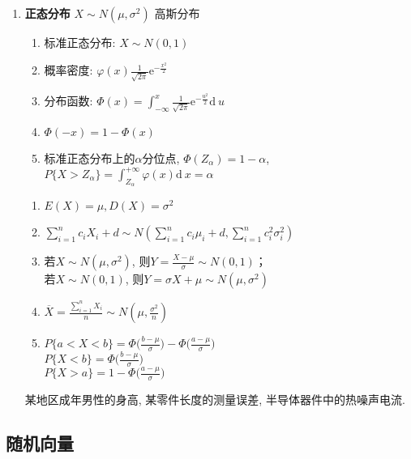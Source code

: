 \documentclass[10pt,a4paper,nofonts]{ctexart}
\newcommand{\D}{\displaystyle}
\renewcommand{\d}{{\mathrm{d}\:\!}}
\newcommand{\e}{{\mathrm{e}}}
\begin{document}
\begin{multicols}{2}
\begin{enumerate}
\item {\bf 正态分布} $X\sim N(\mu,\sigma^2)$ 高斯分布\\
\fbox{$f(x)=\D\frac{1}{\sqrt{2\pi}\sigma}\e^{-\frac{(x-u)^2}{2\sigma^2}}$\\}
\begin{enumerate}
\item 标准正态分布: $X\sim N(0,1)$
\item 概率密度: $\D\varphi(x)\frac{1}{\sqrt{2\pi}}\e^{-\frac{x^2}{2}}$
\item 分布函数: $\D\varPhi(x)=\int_{-\infty}^{x}\frac{1}{\sqrt{2\pi}}\e^{-\frac{u^2}{2}}\d u$
\item $\varPhi(-x)=1-\varPhi(x)$
\item 标准正态分布上的$\alpha$分位点, $\varPhi(Z_\alpha)=1-\alpha$, \\$\D P\{X>Z_\alpha\}=\int_{Z_\alpha}^{+\infty}\varphi(x)\d x=\alpha$
\end{enumerate}
\begin{enumerate}[label={\sf 性质\arabic*}]
\item $E(X)=\mu, D(X)=\sigma^2$
\item $\D \sum_{i=1}^{n}c_iX_i+d\sim N\left(\sum_{i=1}^{n}c_i\mu_i+d,\sum_{i=1}^{n}c_i^2\sigma_i^2\right)$
\item 若$X\sim N(\mu,\sigma^2)$, 则$Y=\D\frac{X-\mu}{\sigma}\sim N(0,1)$；\\
若$X\sim N(0,1)$, 则$Y=\sigma X+\mu\sim N(\mu,\sigma^2)$
\item $\overline{X}=\D\frac{\sum_{i=1}^{n}X_i}{n}\sim N(\mu, \D\frac{\sigma^2}{n})$
\item $\D P\{a<X<b\}=\varPhi\Big(\frac{b-\mu}{\sigma}\Big)-\varPhi\Big(\frac{a-\mu}{\sigma}\Big)$\\
$\D P\{X<b\}=\varPhi\Big(\frac{b-\mu}{\sigma}\Big)$\\
$\D P\{X>a\}=1-\varPhi\Big(\frac{a-\mu}{\sigma}\Big)$
\end{enumerate}
某地区成年男性的身高, 某零件长度的测量误差, 半导体器件中的热噪声电流.

\end{enumerate}

\subsection{随机向量}


\end{multicols}
\end{document}
